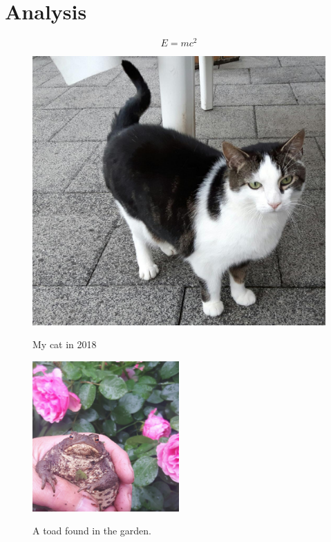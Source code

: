 \chapter{Analysis}\label{chapterAnalysis}

\begin{equation}
E = mc^2
\label{Einstein}
\end{equation}


\begin{figure}[p]
\centering
\includegraphics{img/Dala}
\label{img:cat}
\caption{My cat in 2018}
\end{figure}

\blindmathtrue\Blindtext\Blindtext




\begin{figure}[p]
\centering
\includegraphics[width=0.5\textwidth]{img/toad}
\label{img:toad}
\caption{A toad found in the garden.}
\end{figure}
